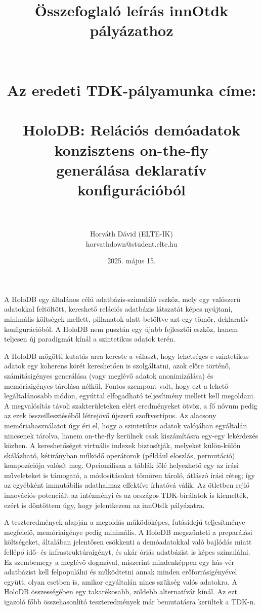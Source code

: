 \documentclass[12pt]{article}
\title{Összefoglaló leírás innOtdk pályázathoz \\ ~ \\ ~ \\ {\Large Az eredeti TDK-pályamunka címe: \\ ~ \\ HoloDB: Relációs demóadatok konzisztens on-the-fly \\ generálása deklaratív konfigurációból} \\ ~}
\author{Horváth Dávid (ELTE-IK) \\ horvathdown@student.elte.hu}
\date{2025. május 15.}
\begin{document}
\begin{titlepage}
\maketitle
\thispagestyle{empty}
\end{titlepage}

\cleardoublepage

A HoloDB egy általános célú adatbázis-szimuláló eszköz, mely egy valószerű adatokkal feltöltött, kereshető relációs adatbázis látszatát képes nyújtani, minimális költségek mellett,
pillanatok alatt betöltve azt egy tömör, deklaratív konfigurációból.
A HoloDB nem pusztán egy újabb fejlesztői eszköz, hanem teljesen új paradigmát kínál a szintetikus adatok terén.

A HoloDB mögötti kutatás arra kereste a választ, hogy lehetséges-e szintetikus adatok egy koherens körét kereshetően is szolgáltatni, azok előre történő, számításigényes generálása (vagy meglévő adatok anonimizálása) és memóriaigényes tárolása nélkül.
Fontos szempont volt, hogy ezt a lehető legáltalánosabb módon, egyúttal elfogadható teljesítmény mellett kell megoldani.
A megvalósítás távoli szakterületeken elért eredményeket ötvöz, a fő nóvum pedig az ezek összeillesztéséből létrejövő újszerű szoftvertípus.
Az alacsony memóriahasználatot úgy éri el, hogy a szintetikus adatok valójában egyáltalán nincsenek tárolva, hanem on-the-fly kerülnek csak kiszámításra egy-egy lekérdezés közben.
A kereshetőséget virtuális indexek biztosítják, melyeket külön-külön skálázható, kétirányban működő operátorok (például eloszlás, permutáció) kompozíciója valósít meg.
Opcionálisan a táblák fölé helyezhető egy az írási műveleteket is támogató, a módosításokat tömören tároló, átlászó írási réteg;
így az egyébként immutábilis adathalmaz effektíve írhatóvá válik.
Az ötletben rejlő innovációs potenciált az intézményi és az országos TDK-bírálatok is kiemelték, ezért is döntöttem úgy, hogy jelentkezem az innOtdk pályázatra.

A teszteredmények alapján a megoldás működőképes, futásidejű teljesítménye megfelelő, memóriaigénye pedig minimális.
A HoloDB megszünteti a preparálási költségeket, általában jelentősen csökkenti a demóadatokkal való bajlódás miatt fellépő idő- és infrastruktúraigényt, és akár óriás adatbázist is képes szimulálni.
Ez szembemegy a meglévő dogmával, miszerint mindenképpen egy hús-vér adatbázist kell felpopulálni és működtetni annak minden erőforrásigényével együtt, olyan esetben is, amikor egyáltalán nincs szükség valós adatokra.
A HoloDB összességében egy takarékosabb, zöldebb alternatívát kínál.
Az ezt igazoló főbb összehasonlító teszteredmények már bemutatásra kerültek a TDK-n.
\end{document}

